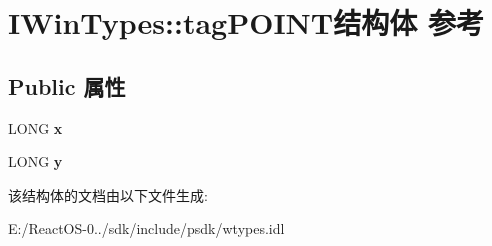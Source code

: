 \hypertarget{struct_i_win_types_1_1tag_p_o_i_n_t}{}\section{I\+Win\+Types\+:\+:tag\+P\+O\+I\+N\+T结构体 参考}
\label{struct_i_win_types_1_1tag_p_o_i_n_t}
\subsection*{Public 属性}
\begin{DoxyCompactItemize}
\item 
\mbox{\label{struct_i_win_types_1_1tag_p_o_i_n_t_a55c9568aea4201da807328745d181a9f}} 
L\+O\+NG {\bfseries x}
\item 
\mbox{\label{struct_i_win_types_1_1tag_p_o_i_n_t_ad29a49110821b971b931c4f69c910f19}} 
L\+O\+NG {\bfseries y}
\end{DoxyCompactItemize}


该结构体的文档由以下文件生成\+:\begin{DoxyCompactItemize}
\item 
E\+:/\+React\+O\+S-\/0../sdk/include/psdk/wtypes.\+idl\end{DoxyCompactItemize}
